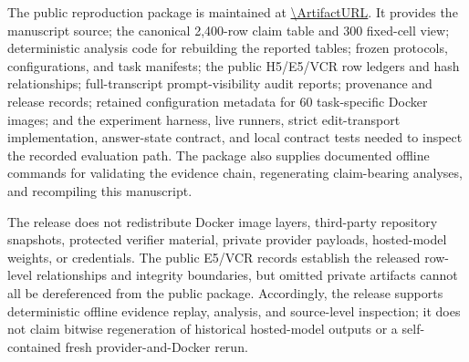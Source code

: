The public reproduction package is maintained at \url{\ArtifactURL}. It
provides the manuscript source; the canonical 2,400-row
claim table and 300 fixed-cell view; deterministic analysis code for rebuilding
the reported tables; frozen protocols, configurations, and task manifests; the
public H5/E5/VCR row ledgers and hash relationships; full-transcript
prompt-visibility audit reports; provenance and release records; retained
configuration metadata for 60 task-specific Docker images; and the experiment
harness, live runners, strict edit-transport implementation, answer-state
contract, and local contract tests needed to inspect the recorded evaluation
path. The package also supplies documented offline commands for validating the
evidence chain, regenerating claim-bearing analyses, and recompiling this
manuscript.

The release does not redistribute Docker image layers, third-party repository
snapshots, protected verifier material, private provider payloads, hosted-model
weights, or credentials. The public E5/VCR records establish the released
row-level relationships and integrity boundaries, but omitted private artifacts
cannot all be dereferenced from the public package. Accordingly, the release
supports deterministic offline evidence replay, analysis, and source-level
inspection; it does not claim bitwise regeneration of historical hosted-model
outputs or a self-contained fresh provider-and-Docker rerun.
